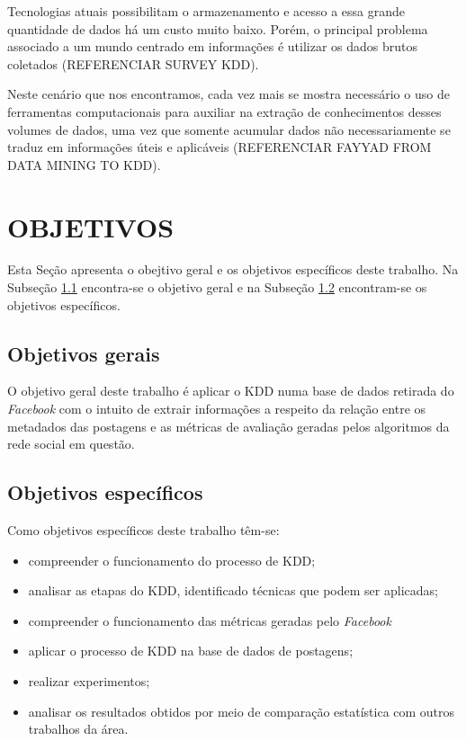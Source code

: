 Tecnologias atuais possibilitam o armazenamento e acesso a essa grande quantidade de dados há um custo muito baixo. Porém, o principal problema associado a um mundo centrado em informações é utilizar os dados brutos coletados (REFERENCIAR SURVEY KDD).

Neste cenário que nos encontramos, cada vez mais se mostra necessário o uso de ferramentas computacionais para auxiliar na extração de conhecimentos desses volumes de dados, uma vez que somente acumular dados não necessariamente se traduz em informações úteis e aplicáveis (REFERENCIAR FAYYAD FROM DATA MINING TO KDD).

\section{OBJETIVOS}
\label{sec:objetivos}
Esta Seção apresenta o obejtivo geral e os objetivos específicos deste trabalho. Na Subseção \ref{subsec:objGerais} encontra-se o objetivo geral e na Subseção \ref{subsec:objEspecificos} encontram-se os objetivos específicos.

\subsection{Objetivos gerais}
\label{subsec:objGerais}
O objetivo geral deste trabalho é aplicar o KDD numa base de dados retirada do \textit{Facebook} com o intuito de extrair informações a respeito da relação entre os metadados das postagens e as métricas de avaliação geradas pelos algoritmos da rede social em questão.

\subsection{Objetivos específicos}
\label{subsec:objEspecificos}
Como objetivos específicos deste trabalho têm-se:
\begin{itemize}
	\item compreender o funcionamento do processo de KDD;
	\item analisar as etapas do KDD, identificado técnicas que podem ser aplicadas;
	\item compreender o funcionamento das métricas geradas pelo \textit{Facebook}
	\item aplicar o processo de KDD na base de dados de postagens;
	\item realizar experimentos;
	\item analisar os resultados obtidos por meio de comparação estatística com outros trabalhos da área.
\end{itemize}

